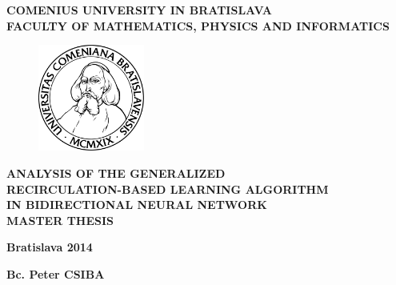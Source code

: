 \begin{center}
    \large{
        \textbf{
            COMENIUS UNIVERSITY IN BRATISLAVA \\ 
            FACULTY OF MATHEMATICS, PHYSICS AND INFORMATICS
        }
    }
\end{center}

\vspace{2cm}

\begin{figure}[!h]
    \centering
    \includegraphics[width=3.5cm]{img/komlogo-new.pdf}
\end{figure}

\vspace{1cm}

\begin{center}
    \large{
        \textbf{
            ANALYSIS OF THE GENERALIZED \\
            RECIRCULATION-BASED LEARNING ALGORITHM \\
            IN BIDIRECTIONAL NEURAL NETWORK \\
            \vspace{3cm}
            MASTER THESIS
        }
    }
\end{center}

\vfill

\begin{multicols}{2}
    \begin{flushleft}
        \textbf{Bratislava 2014}
    \end{flushleft}
    \begin{flushright}
        \textbf{Bc. Peter CSIBA}
    \end{flushright}
\end{multicols}
